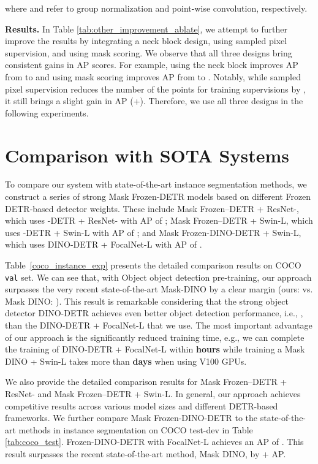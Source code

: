 \documentclass[10pt,twocolumn,letterpaper]{article}
\begin{document}
where  and  refer to group normalization and point-wise convolution, respectively.


\vspace{1mm}
\noindent\textbf{Results.}
In Table \ref{tab:other_improvement_ablate}, we attempt to further improve the results by integrating a neck block design, using sampled pixel supervision, and using mask scoring.
We observe that all three designs bring consistent gains in AP scores. For example, using the neck block improves AP from  to  and using mask scoring improves AP from  to . Notably, while sampled pixel supervision reduces the number of the points for training supervisions by , it still brings a slight gain in AP (+). Therefore, we use all three designs in the following experiments.


\section{Comparison with SOTA Systems}
To compare our system with state-of-the-art instance segmentation methods, we construct a series of strong Mask Frozen-DETR models based on different Frozen DETR-based detector weights. These include Mask Frozen--DETR + ResNet-, which uses -DETR + ResNet- with AP of ; Mask Frozen--DETR + Swin-L, which uses -DETR + Swin-L with AP of ; and Mask Frozen-DINO-DETR + Swin-L, which uses DINO-DETR + FocalNet-L with AP of .


Table~\ref{coco_instance_exp} presents the detailed comparison results on COCO \texttt{val} set. We can see that, with Object object detection pre-training, our approach surpasses the very recent state-of-the-art Mask-DINO by a clear margin (ours:  vs. Mask DINO: ). This result is remarkable considering that the strong object detector DINO-DETR achieves even better object detection performance, i.e., , than the DINO-DETR + FocalNet-L that we use. The most important advantage of our approach is the significantly reduced training time, e.g., we can complete the training of DINO-DETR + FocalNet-L within \textbf{ hours} while training a Mask DINO + Swin-L takes more than \textbf{ days} when using  V100 GPUs.


We also provide the detailed comparison results for Mask Frozen--DETR + ResNet- and Mask Frozen--DETR + Swin-L. In general, our approach achieves competitive results across various model sizes and different DETR-based frameworks.
We further compare Mask Frozen-DINO-DETR to the state-of-the-art methods in instance segmentation on COCO test-dev in Table \ref{tab:coco_test}. Frozen-DINO-DETR with FocalNet-L achieves an AP of . This result surpasses the recent state-of-the-art method, Mask DINO, by + AP.
\end{document}
